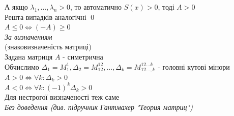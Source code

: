 А якщо $\lambda_1,\dots,\lambda_n > 0$, то автоматично $S(x) > 0$, тоді $A>0$\\
Решта випадків аналогічні \qed
\bigskip \\
 $A \leq 0 \iff (-A) \geq 0$\\
\textit{За визначенням}
\bigskip \\
 (знаковизначеність матриці)\\
Задана матриця $A$ - симетрична\\
Обчислимо $\Delta_1 = M_1^1, \Delta_2 = M_{12}^{12}, \dots, \Delta_k = M^{12\dots k}_{12 \dots, k}$ - головні кутові мінори\\
$A>0 \iff \forall k: \Delta_k > 0$\\
$A < 0 \iff \forall k: (-1)^k \Delta_k > 0$\\
Для нестрогої визначеності теж саме\\
\textit{Без доведення (див. підручник Гантмахер "Теория матриц")}
\bigskip \\
\fi

\iffalse
